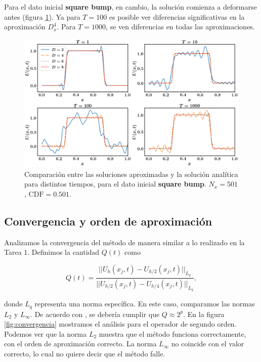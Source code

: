 \documentclass[12pt]{article}
\begin{document}
Para el dato inicial \textbf{square bump}, en cambio, la soluci\'on comienza a deformarse antes (figura \ref{fig:square}). Ya para $T=100$ es posible ver diferencias significativas en la aproximaci\'on $D_x^4$. Para $T=1000$, se ven diferencias en todas las aproximaciones.

\begin{figure}
\center
\includegraphics[scale=0.3]{square.png}
\caption{Comparaci\'on entre las soluciones aproximadas y la soluci\'on anal\'itica para distintos tiempos, para el dato inicial \textbf{square bump}. $N_x=501$, $\mathrm{CDF} = 0.501$.} \label{fig:square}
\end{figure}

\subsection{Convergencia y orden de aproximaci\'on}

Analizamos la convergencia del m\'etodo de manera similar a lo realizado en la Tarea 1. Definimos la cantidad $Q(t)$ como

\begin{equation}
Q(t) = \dfrac{||U_{h}(x_j, t) - U_{h/2}(x_j, t)||_{L_q}}{||U_{h/2}(x_j, t) - U_{h/4}(x_j, t)||_{L_q}},
\end{equation}

donde $L_q$ representa una norma espec\'ifica. En este caso, comparamos las normas $L_2$ y $L_{\infty}$. De acuerdo con \cite{Kreiss-Ortiz}, se deber\'ia cumplir que $Q\approx 2^p$. En la figura \ref{fig:convergencia} mostramos el an\'alisis para el operador de segundo orden. Podemos ver que la norma $L_2$ muestra que el m\'etodo funciona correctamente, con el orden de aproximaci\'on correcto. La norma $L_{\infty}$ no coincide con el valor correcto, lo cual no quiere decir que el m\'etodo falle.
\end{document}
